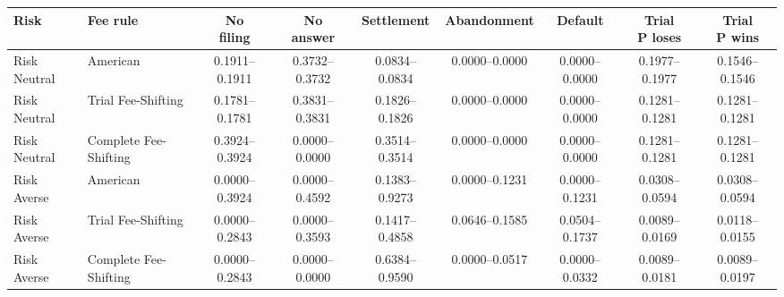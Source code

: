 \documentclass[10pt,border=5pt]{standalone}
\begin{document}
\begin{tabular}{llccccccc}
\toprule Risk & Fee rule & \shortstack{No\\filing} & \shortstack{No\\answer} & Settlement & Abandonment & Default & \shortstack{Trial\\P loses} & \shortstack{Trial\\P wins} \\
\midrule
Risk Neutral & American & 0.1911--0.1911 & 0.3732--0.3732 & 0.0834--0.0834 & 0.0000--0.0000 & 0.0000--0.0000 & 0.1977--0.1977 & 0.1546--0.1546 \\
Risk Neutral & Trial Fee-Shifting & 0.1781--0.1781 & 0.3831--0.3831 & 0.1826--0.1826 & 0.0000--0.0000 & 0.0000--0.0000 & 0.1281--0.1281 & 0.1281--0.1281 \\
Risk Neutral & Complete Fee-Shifting & 0.3924--0.3924 & 0.0000--0.0000 & 0.3514--0.3514 & 0.0000--0.0000 & 0.0000--0.0000 & 0.1281--0.1281 & 0.1281--0.1281 \\
Risk Averse & American & 0.0000--0.3924 & 0.0000--0.4592 & 0.1383--0.9273 & 0.0000--0.1231 & 0.0000--0.1231 & 0.0308--0.0594 & 0.0308--0.0594 \\
Risk Averse & Trial Fee-Shifting & 0.0000--0.2843 & 0.0000--0.3593 & 0.1417--0.4858 & 0.0646--0.1585 & 0.0504--0.1737 & 0.0089--0.0169 & 0.0118--0.0155 \\
Risk Averse & Complete Fee-Shifting & 0.0000--0.2843 & 0.0000--0.0000 & 0.6384--0.9590 & 0.0000--0.0517 & 0.0000--0.0332 & 0.0089--0.0181 & 0.0089--0.0197 \\
\bottomrule\end{tabular}
\end{document}
